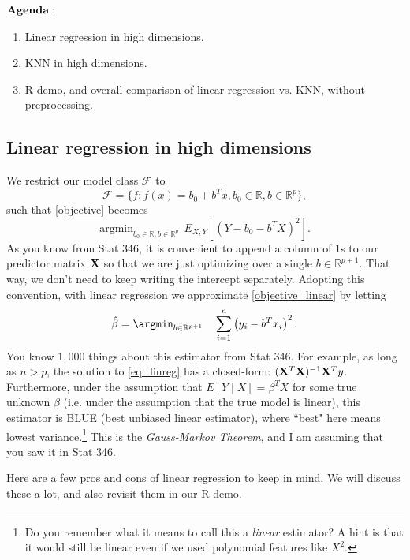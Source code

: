 $\bold{Agenda:}$
\begin{enumerate}
\item Linear regression in high dimensions.
\item KNN in high dimensions. 
\item R demo, and overall comparison of linear regression vs. KNN, without preprocessing.
\end{enumerate}

\subsection{Linear regression in high dimensions}

We restrict our model class $\mathcal{F}$ to
$$
\mathcal{F} = \{ f : f(x) = b_0 + b^T x, b_0 \in \mathbb{R}, b \in \mathbb{R}^p\},
$$
such that \eqref{objective} becomes
\begin{equation}
\label{objective_linear}
\mathrm{argmin}_{b_0 \in \mathbb{R}, b \in \mathbb{R}^p} \ \ E_{X,Y} \left[ \left(Y - b_0 - b^T X \right)^2 \right].
\end{equation}
As you know from Stat 346, it is convenient to append a column of $1$s to our predictor matrix $\bold{X}$ so that we are just optimizing over a single $b \in \mathbb{R}^{p+1}$. That way, we don't need to keep writing the intercept separately. Adopting this convention, with linear regression we approximate \eqref{objective_linear} by letting
\begin{equation}
\label{eq_linreg}
\hat{\beta} = \argmin_{b \in \mathbb{R}^{p+1}}  \ \ \ \sum_{i=1}^n \left(y_i - b^T x_i \right)^2. 
\end{equation}
You know $1,000$ things about this estimator from Stat 346. For example, as long as $n > p$, the solution to \eqref{eq_linreg} has a closed-form: $(\bold{X}^T\bold{X})^{-1} \bold{X}^T y$. Furthermore, under the assumption that $E[Y \mid X] = \beta^T X$ for some true unknown $\beta$ (i.e. under the assumption that the true model is linear), this estimator is BLUE (best unbiased linear estimator), where ``best" here means lowest variance.\footnote{Do you remember what it means to call this a \emph{linear} estimator? A hint is that it would still be linear even if we used polynomial features like $X^2$.} This is the \emph{Gauss-Markov Theorem}, and I am assuming that you saw it in Stat 346. 

Here are a few pros and cons of linear regression to keep in mind. We will discuss these  a lot, and also revisit them in our R demo.


